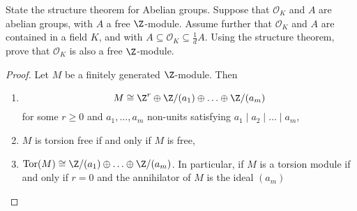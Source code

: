 \documentclass[10pt]{amsart}
\begin{document}
\begin{thm}
  State the structure theorem for Abelian groups.
  Suppose that $\mathcal{O}_K$ and $A$ are abelian groups, with $A$ a free $\Z$-module.
  Assume further that $\mathcal{O}_K$ and $A$ are contained in a field $K$, and with $A \subseteq \mathcal{O}_K \subseteq \frac{1}{d}A$.
  Using the structure theorem, prove that $\mathcal{O}_K$ is also a free $\Z$-module.

  \begin{proof}
    Let $M$ be a finitely generated $\Z$-module.
    Then
    \begin{enumerate}
      \item\label{6.1}
        $$M \cong \Z^r \oplus \Z/(a_1) \oplus \ldots \oplus \Z/(a_m)$$
        for some $r \geq 0$ and $a_1, \ldots, a_m$ non-units satisfying $a_1 \mid a_2 \mid \ldots \mid a_m$,
      \item
        $M$ is torsion free if and only if $M$ is free,
      \item
        $\operatorname{Tor}(M) \cong \Z/(a_1) \oplus \ldots \oplus \Z/(a_m)$.
        In particular, if $M$ is a torsion module if and only if $r = 0$ and the annihilator of $M$ is the ideal $(a_m)$
    \end{enumerate}
    
    
  \end{proof}
\end{thm}
\end{document}
